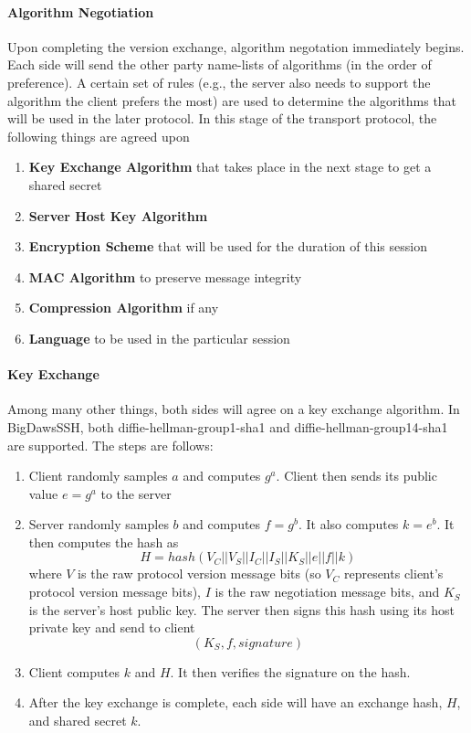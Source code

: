 \documentclass[10pt,sigconf]{acmart}
\begin{document}
\paragraph{\textbf{Algorithm Negotiation}}
Upon completing the version exchange, algorithm negotation immediately begins. Each side will send the other party name-lists of algorithms (in the order of preference). A certain set of rules (e.g., the server also needs to support the algorithm the client prefers the most) are used to determine the algorithms that will be used in the later protocol. In this stage of the transport protocol, the following things are agreed upon
\begin{enumerate}
  \item \textbf{Key Exchange Algorithm} that takes place in the next stage to get a shared secret
  \item \textbf{Server Host Key Algorithm}
  \item \textbf{Encryption Scheme} that will be used for the duration of this session
  \item \textbf{MAC Algorithm} to preserve message integrity
  \item \textbf{Compression Algorithm} if any
  \item \textbf{Language} to be used in the particular session
\end{enumerate} 
\paragraph{\textbf{Key Exchange}}
Among many other things, both sides will agree on a key exchange algorithm. In BigDawsSSH, both diffie-hellman-group1-sha1 and diffie-hellman-group14-sha1 are supported. The steps are follows:
\begin{enumerate}
  \item Client randomly samples $a$ and computes $g^{a}$. Client then sends its public value $e = g^{a}$ to the server
  \item Server randomly samples $b$ and computes $f = g^{b}$. It also computes $k = e^{b}$. It then computes the hash as \[
  H = hash(V_C || V_S || I_C || I_S || K_S || e || f || k)
  \] where $V$ is the raw protocol version message bits (so $V_C$ represents client's protocol version message bits), $I$ is the raw negotiation message bits, and $K_S$ is the server's host public key. The server then signs this hash using its host private key and send to client \[(K_S, f, signature)\]
  \item Client computes $k$ and $H$. It then verifies the signature on the hash.
  \item After the key exchange is complete, each side will have an exchange hash, $H$, and shared secret $k$.
\end{enumerate}
\end{document}
